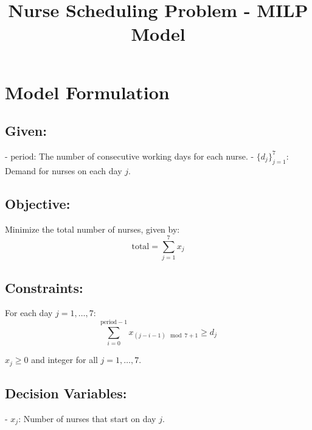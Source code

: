 \documentclass{article}
\begin{document}
\title{Nurse Scheduling Problem - MILP Model}
\author{}
\date{}
\maketitle

\section*{Model Formulation}

\subsection*{Given:}
- \(\text{period}\): The number of consecutive working days for each nurse.
- \(\{d_j\}_{j=1}^{7}\): Demand for nurses on each day \( j \).

\subsection*{Objective:}
Minimize the total number of nurses, given by:
\[
\text{total} = \sum_{j=1}^{7} x_j
\]

\subsection*{Constraints:}
For each day \( j = 1, \ldots, 7 \):
\[
\sum_{i=0}^{\text{period} - 1} x_{(j-i-1) \mod 7 + 1} \geq d_j
\]

\( x_j \geq 0 \) and integer for all \( j = 1, \ldots, 7 \).

\vspace{1cm}

\subsection*{Decision Variables:}
- \( x_j \): Number of nurses that start on day \( j \).
\end{document}
